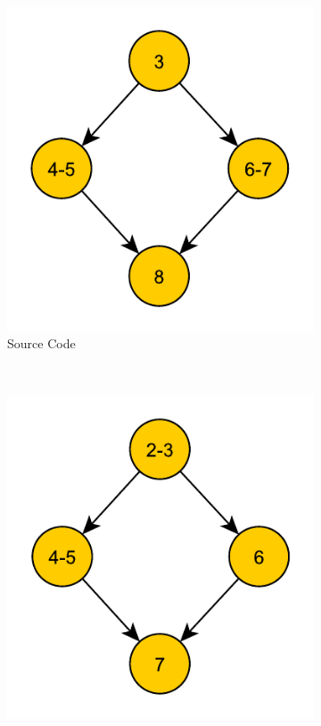 \begin{figure}[h!]
\centering
\begin{subfigure}[t]{.33\textwidth}
\captionsetup{margin=10pt}
\includegraphics[width=\textwidth]{figures/CondExecSrcFlowChart.pdf}
\caption{Source Code}
\label{fig:cfgSrc}
\end{subfigure}%
~
\begin{subfigure}[t]{.33\textwidth}
\captionsetup{margin=10pt}
\includegraphics[width=\textwidth]{figures/CondExecObjUnoptFlowChart.pdf}

\end{subfigure}
\end{figure}
